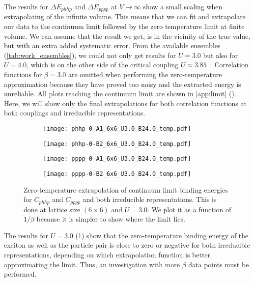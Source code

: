 The results for $\Delta E_{phhp}$ and $\Delta E_{pppp}$ at $V\to\infty$ show a small scaling when extrapolating of the infinite volume. This means that we can fit and extrapolate our data to the continuum limit followed by the zero temperature limit at finite volume. We can assume that the result we get, is in the vicinity of the true value, but with an extra added systematic error. From the available ensembles (\cref{tab:work_ensembles}), we could not only get results for $U=3.0$ but also for $U=4.0$, which is on the other side of the critical coupling $U\approx 3.85$~\cite{mott}. Correlation functions for $\beta = 3.0$ are omitted when performing the zero-temperature approximation because they have proved too noisy and the extracted energy is unreliable. All plots reaching the continuum limit are shown in \cref{app:limit} (). Here, we will show only the final extrapolations for both correlation functions at both couplings and irreducible representations.  
\begin{figure}[!htbp]
    \begin{subfigure}{.5\textwidth}
      \centering
      \texttt{[image: phhp-0-A1\_6x6\_U3.0\_B24.0\_temp.pdf]}
    \end{subfigure}%
    \begin{subfigure}{.5\textwidth}
      \centering
      \texttt{[image: phhp-0-B2\_6x6\_U3.0\_B24.0\_temp.pdf]}
    \end{subfigure}
    \begin{subfigure}{.5\textwidth}
        \centering
        \texttt{[image: pppp-0-A1\_6x6\_U3.0\_B24.0\_temp.pdf]}
    \end{subfigure}
    \begin{subfigure}{.5\textwidth}
        \centering
        \texttt{[image: pppp-0-B2\_6x6\_U3.0\_B24.0\_temp.pdf]}
    \end{subfigure}
    \caption{Zero-temperature extrapolation of continuum limit binding energies for $C_{phhp}$ and $C_{pppp}$ and both irreducible representations. This is done at lattice size $(6\times 6)$ and $U=3.0$. We plot it as a function of $1/\beta$ because it is simpler to show where the limit lies.}
    \label{fig:u3temp}
  \end{figure}
The results for $U=3.0$ (\cref{fig:u3temp}) show that the zero-temperature binding energy of the exciton as well as the particle pair is close to zero or negative for both irreducible representations, depending on which extrapolation function is better approximating the limit. Thus, an investigation with more $\beta$ data points must be performed.
